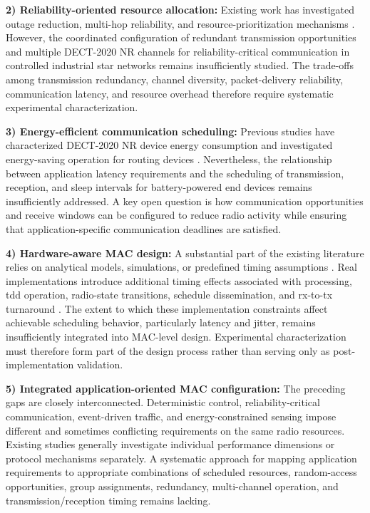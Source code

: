 \documentclass[12pt,a4paper]{article}
\begin{document}
\textbf{2) Reliability-oriented resource allocation:}
Existing work has investigated outage reduction, multi-hop reliability, and resource-prioritization mechanisms
\cite{ahmadMACProtocolReducing2024,
ahmadMACLayerProtocolUltraReliable2025,
binasifIRSAssistedDECT2020NR2025}.
However, the coordinated configuration of redundant transmission opportunities and multiple DECT-2020 NR channels for reliability-critical communication in controlled industrial star networks remains insufficiently studied. The trade-offs among transmission redundancy, channel diversity, packet-delivery reliability, communication latency, and resource overhead therefore require systematic experimental characterization.

\textbf{3) Energy-efficient communication scheduling:}
Previous studies have characterized DECT-2020 NR device energy consumption and investigated energy-saving operation for routing devices
\cite{nihtilaEnergyConsumptionDECT20202022,
nihtilaEnergySavingRouter2022}.
Nevertheless, the relationship between application latency requirements and the scheduling of transmission, reception, and sleep intervals for battery-powered end devices remains insufficiently addressed. A key open question is how communication opportunities and receive windows can be configured to reduce radio activity while ensuring that application-specific communication deadlines are satisfied.

\textbf{4) Hardware-aware MAC design:}
A substantial part of the existing literature relies on analytical models, simulations, or predefined timing assumptions
\cite{dhanwaniAssessmentCandidateTechnology2020,
anttonenEnablingMassiveMachine2021a,
pennerURLLCPerformanceEvaluation2021}.
Real implementations introduce additional timing effects associated with processing, \gls{tdd} operation, radio-state transitions, schedule dissemination, and \gls{rx}-to-\gls{tx} turnaround
\cite{wassmannPerformanceDECT2020NR2024,
haqueDECT2020NRLink2025,
grafWhatExpectWhen2026}.
The extent to which these implementation constraints affect achievable scheduling behavior, particularly latency and jitter, remains insufficiently integrated into MAC-level design. Experimental characterization must therefore form part of the design process rather than serving only as post-implementation validation.

\textbf{5) Integrated application-oriented MAC configuration:}
The preceding gaps are closely interconnected. Deterministic control, reliability-critical communication, event-driven traffic, and energy-constrained sensing impose different and sometimes conflicting requirements on the same radio resources. Existing studies generally investigate individual performance dimensions or protocol mechanisms separately. A systematic approach for mapping application requirements to appropriate combinations of scheduled resources, random-access opportunities, group assignments, redundancy, multi-channel operation, and transmission/reception timing remains lacking.
\end{document}
